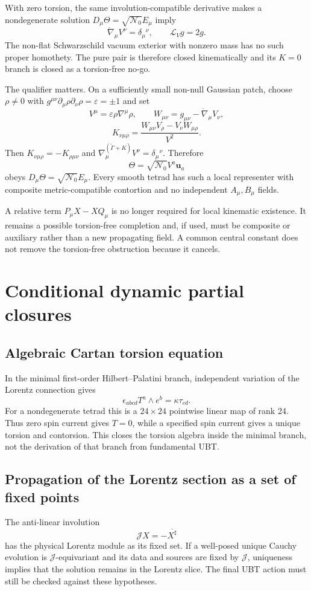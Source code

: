With zero torsion, the same involution-compatible derivative makes a
nondegenerate solution $D_\mu\Theta=\sqrt{\mathcal N_0}E_\mu$ imply
\[
 \boxed{\mathring\nabla_\mu V^\nu=\delta_\mu{}^\nu,}
 \qquad \mathcal L_Vg=2g.
\]
The non-flat Schwarzschild vacuum exterior with nonzero mass has no such proper
homothety.  The pure pair is therefore closed kinematically and its $K=0$
branch is closed as a torsion-free no-go.

The qualifier matters.  On a sufficiently small non-null Gaussian patch,
choose $\rho\ne0$ with
$g^{\mu\nu}\partial_\mu\rho\partial_\nu\rho=\varepsilon=\pm1$ and set
\[
 V^\mu=\varepsilon\rho\nabla^\mu\rho,
 \qquad
 W_{\mu\nu}=g_{\mu\nu}-\mathring\nabla_\mu V_\nu,
\]
\[
 \boxed{K_{\nu\mu\rho}
 =\frac{W_{\mu\nu}V_\rho-V_\nu W_{\mu\rho}}{V^2}.}
\]
Then $K_{\nu\mu\rho}=-K_{\rho\mu\nu}$ and
$\nabla^{(\mathring\Gamma+K)}_\mu V^\nu=\delta_\mu{}^\nu$.  Therefore
\[
 \Theta=\sqrt{\mathcal N_0}V^a\mathbf u_a
\]
obeys $D_\mu\Theta=\sqrt{\mathcal N_0}E_\mu$.  Every smooth tetrad has such a
local representer with composite metric-compatible contortion and no
independent $A_\mu,B_\mu$ fields.

A relative term $P_\mu X-XQ_\mu$ is no longer required for local kinematic
existence.  It remains a possible torsion-free completion and, if used, must be
composite or auxiliary rather than a new propagating field.  A common central
constant does not remove the torsion-free obstruction because it cancels.

\section{Conditional dynamic partial closures}
\subsection{Algebraic Cartan torsion equation}
In the minimal first-order Hilbert--Palatini branch, independent variation of
the Lorentz connection gives
\[
 \epsilon_{abcd}T^a\wedge e^b=\kappa\tau_{cd}.
\]
For a nondegenerate tetrad this is a $24\times24$ pointwise linear map of rank
24. Thus zero spin current gives $T=0$, while a specified spin current gives a
unique torsion and contorsion. This closes the torsion algebra inside the
minimal branch, not the derivation of that branch from fundamental UBT.

\subsection{Propagation of the Lorentz section as a set of fixed points}
The anti-linear involution
\[
 \mathcal JX=-\overline{X^\sharp}
\]
has the physical Lorentz module as its fixed set. If a well-posed unique
Cauchy evolution is $\mathcal J$-equivariant and its data and sources are fixed
by $\mathcal J$, uniqueness implies that the solution remains in the Lorentz
slice. The final UBT action must still be checked against these hypotheses.

